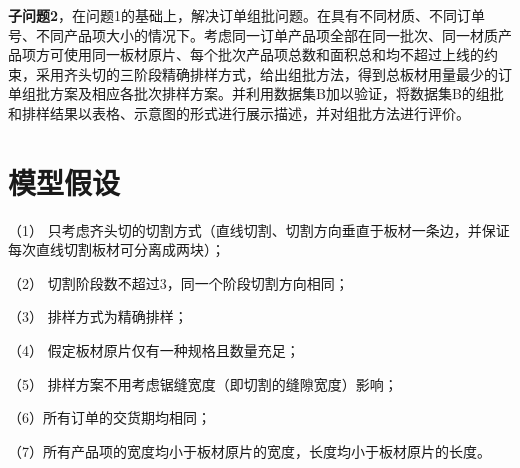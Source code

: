 \documentclass[bwprint]{gmcmthesis}
\begin{document}
\textbf{子问题2}，在问题1的基础上，解决订单组批问题。在具有不同材质、不同订单号、不同产品项大小的情况下。考虑同一订单产品项全部在同一批次、同一材质产品项方可使用同一板材原片、每个批次产品项总数和面积总和均不超过上线的约束，采用齐头切的三阶段精确排样方式，给出组批方法，得到总板材用量最少的订单组批方案及相应各批次排样方案。并利用数据集B加以验证，将数据集B的组批和排样结果以表格、示意图的形式进行展示描述，并对组批方法进行评价。

\newpage

\section{模型假设}

（1） 只考虑齐头切的切割方式（直线切割、切割方向垂直于板材一条边，并保证每次直线切割板材可分离成两块）；

（2） 切割阶段数不超过3，同一个阶段切割方向相同；

（3） 排样方式为精确排样；

（4） 假定板材原片仅有一种规格且数量充足；

（5） 排样方案不用考虑锯缝宽度（即切割的缝隙宽度）影响；

（6）所有订单的交货期均相同；

（7）所有产品项的宽度均小于板材原片的宽度，长度均小于板材原片的长度。

\quad
\end{document}
